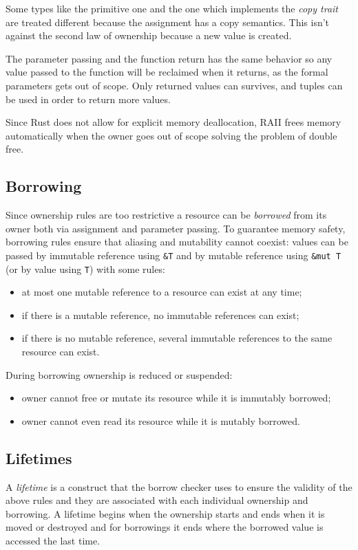 Some types like the primitive one and the one which implements the \emph{copy trait} are treated different because the assignment has a copy semantics.
This isn't against the second law of ownership because a new value is created.

The parameter passing and the function return has the same behavior so any value passed to the function will be reclaimed when it returns, as the formal parameters gets out of scope.
Only returned values can survives, and tuples can be used in order to return more values.

Since Rust does not allow for explicit memory deallocation, RAII frees memory automatically when the owner goes out of scope solving the problem of double free.

\subsection{Borrowing}
Since ownership rules are too restrictive a resource can be \emph{borrowed} from its owner both via assignment and parameter passing.
To guarantee memory safety, borrowing rules ensure that aliasing and mutability cannot coexist: values can be passed by immutable reference using \verb|&T| and by mutable reference using \verb|&mut T| (or by value using \verb|T|) with some rules:
\begin{itemize}
    \item at most one mutable reference to a resource can exist at any time;
    \item if there is a mutable reference, no immutable references can exist;
    \item if there is no mutable reference, several immutable references to the same resource can exist.
\end{itemize}
During borrowing ownership is reduced or suspended:
\begin{itemize}
    \item owner cannot free or mutate its resource while it is immutably borrowed;
    \item owner cannot even read its resource while it is mutably borrowed.
\end{itemize}

\subsection{Lifetimes}
A \emph{lifetime} is a construct that the borrow checker uses to ensure the validity of the above rules and they are associated with each individual ownership and borrowing.
A lifetime begins when the ownership starts and ends when it is moved or destroyed and for borrowings it ends where the borrowed value is accessed the last time.

